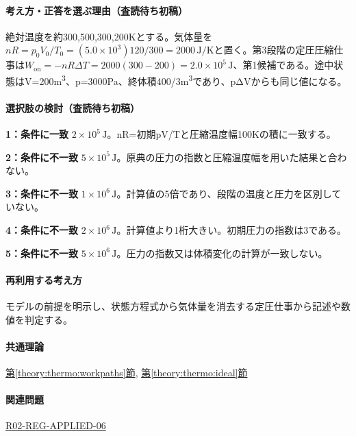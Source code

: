 \paragraph{考え方・正答を選ぶ理由（査読待ち初稿）} 絶対温度を約300,500,300,200Kとする。気体量を\(nR=p_0V_0/T_0=(5.0\times10^3)120/300=2000\,\mathrm{J/K}\)と置く。第3段階の定圧圧縮仕事は\(W_{\mathrm{on}}=-nR\Delta T=2000(300-200)=2.0\times10^5\,\mathrm{J}\)、第1候補である。途中状態はV=\allowbreak{}200m\textsuperscript{3}、p=\allowbreak{}3000Pa、終体積400/3m\textsuperscript{3}であり、pΔVからも同じ値になる。

\paragraph{選択肢の検討（査読待ち初稿）}\mbox{}\par

\noindent\textbf{1：条件に一致} \(2\times10^5\,\mathrm{J}\)。nR=初期pV/Tと圧縮温度幅100Kの積に一致する。\par

\noindent\textbf{2：条件に不一致} \(5\times10^5\,\mathrm{J}\)。原典の圧力の指数と圧縮温度幅を用いた結果と合わない。\par

\noindent\textbf{3：条件に不一致} \(1\times10^6\,\mathrm{J}\)。計算値の5倍であり、段階の温度と圧力を区別していない。\par

\noindent\textbf{4：条件に不一致} \(2\times10^6\,\mathrm{J}\)。計算値より1桁大きい。初期圧力の指数は3である。\par

\noindent\textbf{5：条件に不一致} \(5\times10^6\,\mathrm{J}\)。圧力の指数又は体積変化の計算が一致しない。\par

\paragraph{再利用する考え方} モデルの前提を明示し、状態方程式から気体量を消去する定圧仕事から記述や数値を判定する。

\paragraph{共通理論} \hyperref[theory:thermo:workpaths]{第\ref*{theory:thermo:workpaths}節}, \hyperref[theory:thermo:ideal]{第\ref*{theory:thermo:ideal}節}

\paragraph{関連問題} \hyperref[q:r02-reg-applied-06]{R02-REG-APPLIED-06}


